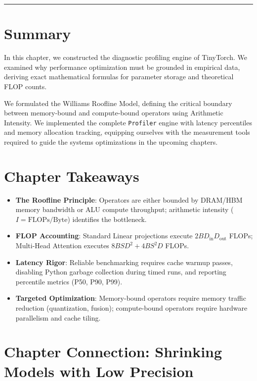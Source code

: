 \documentclass[
  letterpaper,
]{scrbook}
\providecommand{\tightlist}{%
  \setlength{\itemsep}{0pt}\setlength{\parskip}{0pt}}
\begin{document}
\begin{center}\rule{0.5\linewidth}{0.5pt}\end{center}

\section{Summary}\label{summary-14}

In this chapter, we constructed the diagnostic profiling engine of
TinyTorch. We examined why performance optimization must be grounded in
empirical data, deriving exact mathematical formulas for parameter
storage and theoretical FLOP counts.

We formulated the Williams Roofline Model, defining the critical
boundary between memory-bound and compute-bound operators using
Arithmetic Intensity. We implemented the complete \texttt{Profiler}
engine with latency percentiles and memory allocation tracking,
equipping ourselves with the measurement tools required to guide the
systems optimizations in the upcoming chapters.

\section{Chapter Takeaways}\label{chapter-takeaways-14}

\begin{itemize}
\tightlist
\item
  \textbf{The Roofline Principle}: Operators are either bounded by
  DRAM/HBM memory bandwidth or ALU compute throughput; arithmetic
  intensity (\(I = \text{FLOPs}/\text{Byte}\)) identifies the
  bottleneck.
\item
  \textbf{FLOP Accounting}: Standard Linear projections execute
  \(2 B D_{\text{in}} D_{\text{out}}\) FLOPs; Multi-Head Attention
  executes \(8 B S D^2 + 4 B S^2 D\) FLOPs.
\item
  \textbf{Latency Rigor}: Reliable benchmarking requires cache warmup
  passes, disabling Python garbage collection during timed runs, and
  reporting percentile metrics (P50, P90, P99).
\item
  \textbf{Targeted Optimization}: Memory-bound operators require memory
  traffic reduction (quantization, fusion); compute-bound operators
  require hardware parallelism and cache tiling.
\end{itemize}

\section{Chapter Connection: Shrinking Models with Low
Precision}\label{chapter-connection-shrinking-models-with-low-precision}
\end{document}
